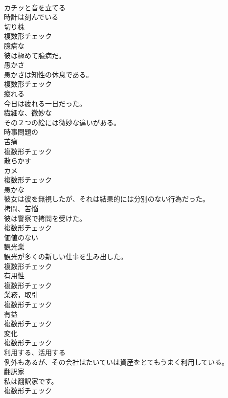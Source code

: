 \documentclass[8pt]{extreport}
\begin{document}
\begin{CJK}{UTF8}{min}
\\	[動詞]	カチッと音を立てる	
\\	時計は刻んでいる	
\\	[名詞]	切り株	
\\	複数形チェック
\\	[形容詞]	臆病な	
\\	彼は極めて臆病だ。	
\\	[名詞]	愚かさ	
\\	愚かさは知性の休息である。	
\\	複数形チェック
\\	[形容詞]	疲れる	
\\	今日は疲れる一日だった。	
\\	[形容詞]	繊細な、微妙な	
\\	その２つの絵には微妙な違いがある。	
\\	[形容詞]	時事問題の	
\\	[名詞]	苦痛	
\\	複数形チェック
\\	[動詞]	散らかす	
\\	[名詞]	カメ	
\\	複数形チェック
\\	[形容詞]	愚かな	
\\	彼女は彼を無視したが、それは結果的には分別のない行為だった。	
\\	[名詞]	拷問、苦悩	
\\	彼は警察で拷問を受けた。	
\\	複数形チェック
\\	[形容詞]	価値のない	
\\	[名詞]	観光業	
\\	観光が多くの新しい仕事を生み出した。	
\\	複数形チェック
\\	[名詞]	有用性	
\\	複数形チェック
\\	[名詞]	業務，取引	
\\	複数形チェック
\\	[名詞]	有益	
\\	複数形チェック
\\	[名詞]	変化	
\\	複数形チェック
\\	[動詞]	利用する、活用する	
\\	例外もあるが、その会社はたいていは資産をとてもうまく利用している。	
\\	[名詞]	翻訳家	
\\	私は翻訳家です。	
\\	複数形チェック

\end{CJK}
\end{document}
